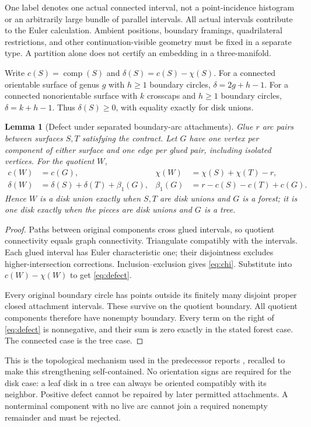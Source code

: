 \documentclass[11pt,a4paper]{article}
\newtheorem{lemma}[theorem]{Lemma}
\theoremstyle{definition}
\theoremstyle{remark}
\newcommand{\comp}{\operatorname{comp}}
\begin{document}
One label denotes one actual connected interval, not a point-incidence histogram or an
arbitrarily large bundle of parallel intervals. All actual intervals contribute to the
Euler calculation. Ambient positions, boundary framings, quadrilateral restrictions, and
other continuation-visible geometry must be fixed in a separate type. A partition alone
does not certify an embedding in a three-manifold.

Write $c(S)=\comp(S)$ and $\delta(S)=c(S)-\chi(S)$. For a connected orientable
surface of genus $g$ with $h\ge1$ boundary circles, $\delta=2g+h-1$. For a connected
nonorientable surface with $k$ crosscaps and $h\ge1$ boundary circles,
$\delta=k+h-1$. Thus $\delta(S)\ge0$, with equality exactly for disk unions.

\begin{lemma}[Defect under separated boundary-arc attachments]\label{lem:defect}
Glue $r$ arc pairs between surfaces $S,T$ satisfying the contract. Let $G$ have one vertex
per component of either surface and one edge per glued pair, including isolated vertices.
For the quotient $W$,
\begin{align}
 c(W)&=c(G), & \chi(W)&=\chi(S)+\chi(T)-r,\label{eq:chi}\\
 \delta(W)&=\delta(S)+\delta(T)+\beta_1(G), &
 \beta_1(G)&=r-c(S)-c(T)+c(G).\label{eq:defect}
\end{align}
Hence $W$ is a disk union exactly when $S,T$ are disk unions and $G$ is a forest; it
is one disk exactly when the pieces are disk unions and $G$ is a tree.
\end{lemma}
\begin{proof}
Paths between original components cross glued intervals, so quotient connectivity equals
graph connectivity. Triangulate compatibly with the intervals. Each glued interval has
Euler characteristic one; their disjointness excludes higher-intersection corrections.
Inclusion--exclusion gives \eqref{eq:chi}. Substitute into $c(W)-\chi(W)$ to get
\eqref{eq:defect}.

Every original boundary circle has points outside its finitely many disjoint proper
closed attachment intervals. These survive on the quotient boundary. All quotient
components therefore have nonempty boundary. Every term on the right of \eqref{eq:defect}
is nonnegative, and their sum is zero exactly in the stated forest case. The connected
case is the tree case.
\end{proof}

This is the topological mechanism used in the predecessor reports \cite{kernels,bases},
recalled to make this strengthening self-contained. No orientation signs are required for
the disk case: a leaf disk in a tree can always be oriented compatibly with its neighbor.
Positive defect cannot be repaired by later permitted attachments. A nonterminal component
with no live arc cannot join a required nonempty remainder and must be rejected.
\end{document}
